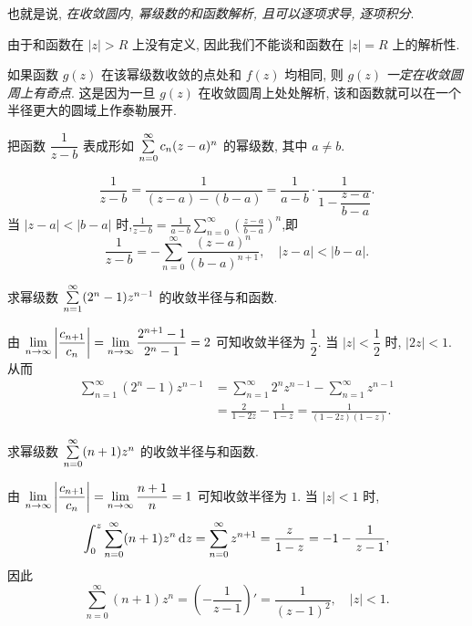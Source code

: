 \documentclass[nocolor,theme=doremi,lang=cn,11pt,chinese,twoside,openright,usesamecnt]{elegantbook}
\begin{document}
也就是说, \emph{在收敛圆内, 幂级数的和函数解析, 且可以逐项求导, 逐项积分}.

由于和函数在 $|z|>R$ 上没有定义, 因此我们不能谈和函数在 $|z|=R$ 上的解析性.

如果函数 $g(z)$ 在该幂级数收敛的点处和 $f(z)$ 均相同, 则 $g(z)$ \emph{一定在收敛圆周上有奇点}.
这是因为一旦 $g(z)$ 在收敛圆周上处处解析, 该和函数就可以在一个半径更大的圆域上作泰勒展开.

\begin{example}
	把函数 $\dfrac1{z-b}$ 表成形如 $\sum\limits_{n=0}^\infty c_n(z-a)^n$ 的幂级数, 其中 $a\neq b$.
\end{example}

\begin{solution}
	\[\frac1{z-b}=\frac1{(z-a)-(b-a)}
	{=\frac1{a-b}\cdot\frac1{1-\dfrac{z-a}{b-a}}.}\]
	{当 $|z-a|<|b-a|$ 时,$\displaystyle\frac1{z-b}=\frac1{a-b}\sum_{n=0}^\infty\left(\frac{z-a}{b-a}\right)^n$,即
	\[\frac1{z-b}=-\sum_{n=0}^\infty\frac{(z-a)^n}{(b-a)^{n+1}},\quad|z-a|<|b-a|.\]}
\end{solution}

\begin{example}
	求幂级数 $\sum\limits_{n=1}^\infty(2^n-1)z^{n-1}$ 的收敛半径与和函数.
\end{example}

\begin{solution}
	由 $\displaystyle\lim_{n\to\infty}\left|\frac{c_{n+1}}{c_n}\right|=\lim_{n\to\infty}\frac{2^{n+1}-1}{2^n-1}=2$ 可知收敛半径为 $\dfrac12$.
	{当 $|z|<\dfrac12$ 时, $|2z|<1$.}
	{从而
	\begin{align*}
	\sum_{n=1}^\infty(2^n-1)z^{n-1}&=\sum_{n=1}^\infty 2^n z^{n-1}-\sum_{n=1}^\infty z^{n-1}\\
	&{=\frac2{1-2z}-\frac1{1-z}=\frac1{(1-2z)(1-z)}.}
	\end{align*}}
\end{solution}

\begin{example}
	求幂级数 $\sum\limits_{n=0}^\infty(n+1)z^n$ 的收敛半径与和函数.
\end{example}

\begin{solution}
	由 $\displaystyle\lim_{n\to\infty}\left|\frac{c_{n+1}}{c_n}\right|=\lim_{n\to\infty}\frac{n+1}n=1$ 可知收敛半径为 $1$.
{当 $|z|<1$ 时,
	\[\int_0^z\sum_{n=0}^\infty(n+1)z^n\,\mathrm{d} z=\sum_{n=0}^\infty z^{n+1}=\frac z{1-z}=-1-\frac1{z-1},\]
}{因此
	\[\sum_{n=0}^\infty(n+1)z^n=\left(-\frac1{z-1}\right)'=\frac1{(z-1)^2},\quad |z|<1.\]}
\end{solution}
\end{document}
